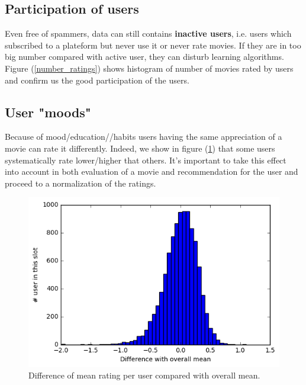 \documentclass[10pt,conference,compsocconf]{IEEEtran}
\begin{document}
\subsection{Participation of users}

Even free of spammers, data can still contains \textbf{inactive users}, i.e. users which subscribed to a plateform but never use it or never rate movies. If they are in too big number compared with active user, they can disturb learning algorithms. Figure (\ref{number_ratings}) shows histogram of number of movies rated by users and confirm us the good participation of the users.

\subsection{User "moods"}

Because of mood/education//habits users having the same appreciation of a movie can rate it differently. Indeed, we show in figure (\ref{mood}) that some users systematically rate lower/higher that others. It's important to take this effect into account in both evaluation of a movie and recommendation for the user and proceed to a normalization of the ratings.



\begin{figure}[htbp] %
  \centering
  \includegraphics[width=\columnwidth]{img/deviation_mean}
  \caption{Difference of mean rating per user compared with overall mean.}
  \vspace{-3mm}
  \label{mood}
\end{figure}

\end{document}

